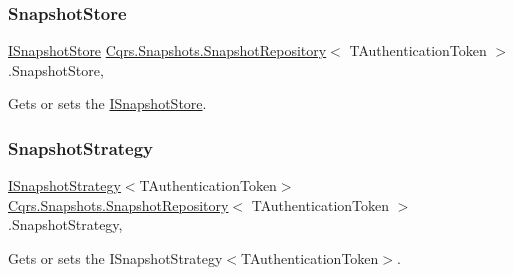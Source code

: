 \mbox{\label{classCqrs_1_1Snapshots_1_1SnapshotRepository_aba01e9f20eb41e6f3e4476a7f3182275_aba01e9f20eb41e6f3e4476a7f3182275}} 
\subsubsection{\texorpdfstring{Snapshot\+Store}{SnapshotStore}}
{\footnotesize\ttfamily \hyperlink{interfaceCqrs_1_1Snapshots_1_1ISnapshotStore}{I\+Snapshot\+Store} \hyperlink{classCqrs_1_1Snapshots_1_1SnapshotRepository}{Cqrs.\+Snapshots.\+Snapshot\+Repository}$<$ T\+Authentication\+Token $>$.Snapshot\+Store\hspace{0.3cm}{\ttfamily [get]}, {\ttfamily [protected]}}



Gets or sets the \hyperlink{interfaceCqrs_1_1Snapshots_1_1ISnapshotStore}{I\+Snapshot\+Store}. 

\mbox{\label{classCqrs_1_1Snapshots_1_1SnapshotRepository_a7d65b4df10d0b6f75c911a9b6d59b3ba_a7d65b4df10d0b6f75c911a9b6d59b3ba}} 
\subsubsection{\texorpdfstring{Snapshot\+Strategy}{SnapshotStrategy}}
{\footnotesize\ttfamily \hyperlink{interfaceCqrs_1_1Snapshots_1_1ISnapshotStrategy}{I\+Snapshot\+Strategy}$<$T\+Authentication\+Token$>$ \hyperlink{classCqrs_1_1Snapshots_1_1SnapshotRepository}{Cqrs.\+Snapshots.\+Snapshot\+Repository}$<$ T\+Authentication\+Token $>$.Snapshot\+Strategy\hspace{0.3cm}{\ttfamily [get]}, {\ttfamily [protected]}}



Gets or sets the I\+Snapshot\+Strategy$<$\+T\+Authentication\+Token$>$. 

